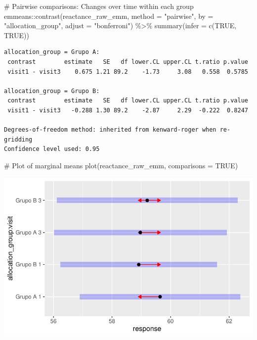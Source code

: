 \documentclass[
  letterpaper,
  DIV=11,
  numbers=noendperiod]{scrartcl}
\newenvironment{Shaded}{\begin{snugshade}}{\end{snugshade}}
\newcommand{\AttributeTok}[1]{\textcolor[rgb]{0.40,0.45,0.13}{#1}}
\newcommand{\CommentTok}[1]{\textcolor[rgb]{0.37,0.37,0.37}{#1}}
\newcommand{\ConstantTok}[1]{\textcolor[rgb]{0.56,0.35,0.01}{#1}}
\newcommand{\FunctionTok}[1]{\textcolor[rgb]{0.28,0.35,0.67}{#1}}
\newcommand{\NormalTok}[1]{\textcolor[rgb]{0.00,0.23,0.31}{#1}}
\newcommand{\SpecialCharTok}[1]{\textcolor[rgb]{0.37,0.37,0.37}{#1}}
\newcommand{\StringTok}[1]{\textcolor[rgb]{0.13,0.47,0.30}{#1}}
\begin{document}
\begin{Shaded}
\begin{Highlighting}[]
\CommentTok{\# Pairwise comparisons: Changes over time within each group}
\NormalTok{emmeans}\SpecialCharTok{::}\FunctionTok{contrast}\NormalTok{(reactance\_raw\_emm, }\AttributeTok{method =} \StringTok{"pairwise"}\NormalTok{, }\AttributeTok{by =} \StringTok{"allocation\_group"}\NormalTok{, }\AttributeTok{adjust =} \StringTok{"bonferroni"}\NormalTok{) }\SpecialCharTok{\%\textgreater{}\%} \FunctionTok{summary}\NormalTok{(}\AttributeTok{infer =} \FunctionTok{c}\NormalTok{(}\ConstantTok{TRUE}\NormalTok{, }\ConstantTok{TRUE}\NormalTok{))}
\end{Highlighting}
\end{Shaded}

\begin{verbatim}
allocation_group = Grupo A:
 contrast        estimate   SE   df lower.CL upper.CL t.ratio p.value
 visit1 - visit3    0.675 1.21 89.2    -1.73     3.08   0.558  0.5785

allocation_group = Grupo B:
 contrast        estimate   SE   df lower.CL upper.CL t.ratio p.value
 visit1 - visit3   -0.288 1.30 89.2    -2.87     2.29  -0.222  0.8247

Degrees-of-freedom method: inherited from kenward-roger when re-gridding 
Confidence level used: 0.95 
\end{verbatim}

\begin{Shaded}
\begin{Highlighting}[]
\CommentTok{\# Plot of marginal means}
\FunctionTok{plot}\NormalTok{(reactance\_raw\_emm, }\AttributeTok{comparisons =} \ConstantTok{TRUE}\NormalTok{)}
\end{Highlighting}
\end{Shaded}

\includegraphics{Outcomes_V1V2V3_files/figure-pdf/reactance_raw_emm-1.pdf}
\end{document}
